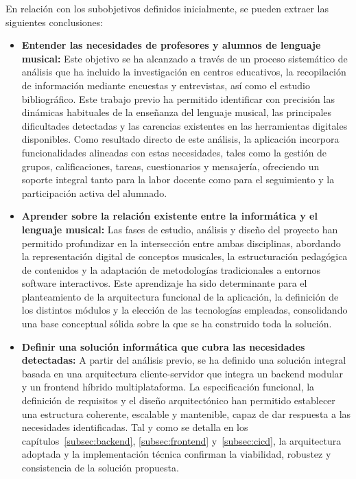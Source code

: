 En relación con los subobjetivos definidos inicialmente, se pueden extraer las siguientes conclusiones:
\begin{itemize}
    \item \textbf{Entender las necesidades de profesores y alumnos de lenguaje musical:}  
    Este objetivo se ha alcanzado a través de un proceso sistemático de análisis que ha incluido la investigación en centros educativos, la recopilación de información mediante encuestas y entrevistas, así como el estudio bibliográfico. Este trabajo previo ha permitido identificar con precisión las dinámicas habituales de la enseñanza del lenguaje musical, las principales dificultades detectadas y las carencias existentes en las herramientas digitales disponibles. Como resultado directo de este análisis, la aplicación incorpora funcionalidades alineadas con estas necesidades, tales como la gestión de grupos, calificaciones, tareas, cuestionarios y mensajería, ofreciendo un soporte integral tanto para la labor docente como para el seguimiento y la participación activa del alumnado.

    \item \textbf{Aprender sobre la relación existente entre la informática y el lenguaje musical:}  
    Las fases de estudio, análisis y diseño del proyecto han permitido profundizar en la intersección entre ambas disciplinas, abordando la representación digital de conceptos musicales, la estructuración pedagógica de contenidos y la adaptación de metodologías tradicionales a entornos software interactivos. Este aprendizaje ha sido determinante para el planteamiento de la arquitectura funcional de la aplicación, la definición de los distintos módulos y la elección de las tecnologías empleadas, consolidando una base conceptual sólida sobre la que se ha construido toda la solución.
\newpage
    \item \textbf{Definir una solución informática que cubra las necesidades detectadas:}  
    A partir del análisis previo, se ha definido una solución integral basada en una arquitectura cliente-servidor que integra un backend modular y un frontend híbrido multiplataforma. La especificación funcional, la definición de requisitos y el diseño arquitectónico han permitido establecer una estructura coherente, escalable y mantenible, capaz de dar respuesta a las necesidades identificadas. Tal y como se detalla en los capítulos~\ref{subsec:backend}, \ref{subsec:frontend} y~\ref{subsec:cicd}, la arquitectura adoptada y la implementación técnica confirman la viabilidad, robustez y consistencia de la solución propuesta.


\end{itemize}
